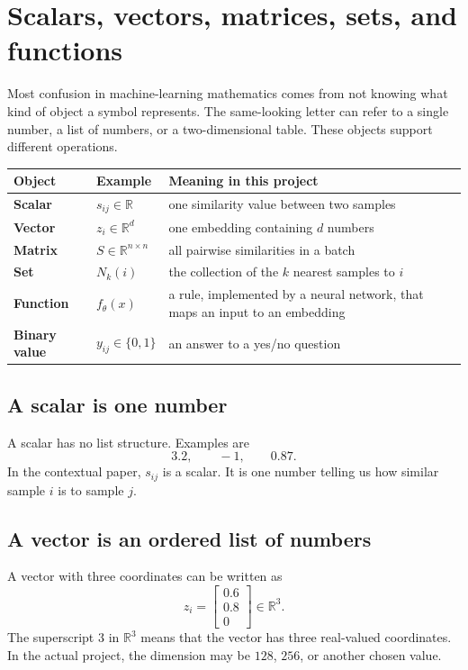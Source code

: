 \documentclass[11pt,oneside,openany]{book}
\theoremstyle{myplain}
\theoremstyle{definition}
\newcommand{\R}{\mathbb{R}}
\begin{document}
\section{Scalars, vectors, matrices, sets, and functions}

Most confusion in machine-learning mathematics comes from not knowing what kind of object a symbol represents. The same-looking letter can refer to a single number, a list of numbers, or a two-dimensional table. These objects support different operations.

\begin{center}
\begin{tabularx}{\textwidth}{>{\bfseries}l l X}
\toprule
Object & Example & Meaning in this project \\
\midrule
Scalar & $s_{ij}\in\R$ & one similarity value between two samples \\
Vector & $z_i\in\R^d$ & one embedding containing $d$ numbers \\
Matrix & $S\in\R^{n\times n}$ & all pairwise similarities in a batch \\
Set & $N_k(i)$ & the collection of the $k$ nearest samples to $i$ \\
Function & $f_\theta(x)$ & a rule, implemented by a neural network, that maps an input to an embedding \\
Binary value & $y_{ij}\in\{0,1\}$ & an answer to a yes/no question \\
\bottomrule
\end{tabularx}
\end{center}

\subsection{A scalar is one number}

A scalar has no list structure. Examples are
\[
  3.2,\qquad -1,\qquad 0.87.
\]
In the contextual paper, $s_{ij}$ is a scalar. It is one number telling us how similar sample $i$ is to sample $j$.

\subsection{A vector is an ordered list of numbers}

A vector with three coordinates can be written as
\[
  z_i=\begin{bmatrix}0.6\\0.8\\0\end{bmatrix}\in\R^3.
\]
The superscript $3$ in $\R^3$ means that the vector has three real-valued coordinates. In the actual project, the dimension may be $128$, $256$, or another chosen value.
\end{document}
